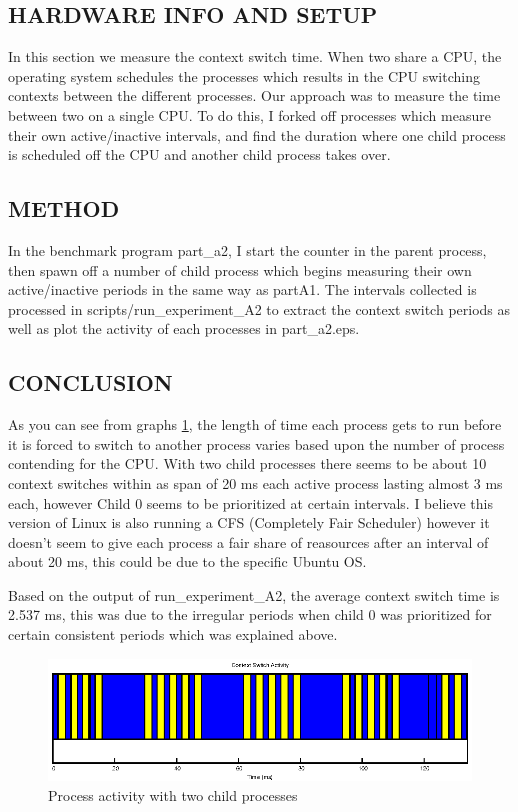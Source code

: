 \documentclass{article}
\begin{document}
\subsection{HARDWARE INFO AND SETUP}

In this section we measure the context switch time. When two share a CPU, the operating system schedules the processes which results in the CPU switching contexts between the different processes. Our approach was to measure the time between two on a single CPU. To do this, I forked off processes which measure their own active/inactive intervals, and find the duration where one child process is scheduled off the CPU and another child process takes over. 

\subsection{METHOD}

In the benchmark program part\_a2, I start the counter in the parent process, then spawn off a number of child process which begins measuring their own active/inactive periods in the same way as partA1. The intervals collected is processed in scripts/run\_experiment\_A2 to extract the context switch periods as well as plot the activity of each processes in part\_a2.eps. 

 
\subsection{CONCLUSION}
As you can see from graphs \ref{fig:parta2}, the length of time each process gets to run before it is forced to switch to another process varies based upon the number of process contending for the CPU. With two child processes there seems to be about 10 context switches within as span of 20 ms each active process lasting almost 3 ms each, however Child 0 seems to be prioritized at certain intervals. I believe this version of Linux is also running a CFS (Completely Fair Scheduler) however it doesn't seem to give each process a fair share of reasources after an interval of about 20 ms, this could be due to the specific Ubuntu OS.

Based on the output of run\_experiment\_A2, the average context switch time is 2.537 ms, this was due to the irregular periods when child 0 was prioritized for certain consistent periods which was explained above.

\begin{figure}
\centering
\includegraphics[scale=1.25]{part_a2.eps}
\caption{Process activity with two child processes}
\label{fig:parta2}
\end{figure}
\end{document}
